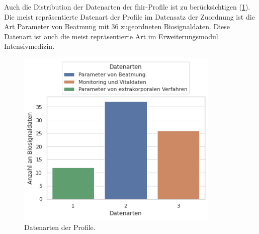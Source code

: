 Auch die Distribution der Datenarten der \ac{fhir}-Profile ist zu berücksichtigen (\ref{fig:datenarten}). Die meist repräsentierte Datenart der Profile im Datensatz der Zuordnung ist die Art \glqq Parameter von Beatmung\grqq{} mit 36 zugeordneten Biosignaldaten. Diese Datenart ist auch die meist repräsentierte Art im Erweiterungsmodul \glqq Intensivmedizin\grqq{}.

\clearpage

\begin{figure}[ht]
	\centering
	\includegraphics[height=8.5cm]{figures/datenarten}
	\caption[Datenarten der Profile]{Datenarten der Profile.}
	\label{fig:datenarten}
\end{figure}

